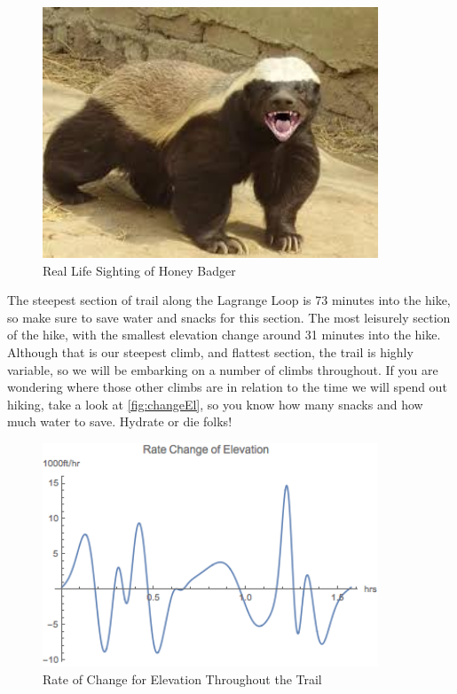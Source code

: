 \documentclass[12pt]{article}   %
\theoremstyle{definition}
\numberwithin{equation}{section}
\begin{document}
\begin{figure} [h]
  \centering
  \includegraphics[width=10cm]{../images/honey_badger.jpeg}
  \caption{Real Life Sighting of Honey Badger}
  \label{fig:honeyB}
\end{figure}

\quad The steepest section of trail along the Lagrange Loop is 73 minutes into the hike, so make sure to save water and snacks for this section. The most leisurely section of the hike, with the smallest elevation change around 31 minutes into the hike.
\quad Although that is our steepest climb, and flattest section, the trail is highly variable, so we will be embarking on a number of climbs throughout. If you are wondering where those other climbs are in relation to the time we will spend out hiking, take a look at \autoref{fig:changeEl}, so you know how many snacks and how much water to save. Hydrate or die folks!

\begin{figure} [h]
  \centering
  \includegraphics[width=10cm]{../images/changeEl.png}
  \caption{Rate of Change for Elevation Throughout the Trail}
  \label{fig:changeEl}
\end{figure}
\end{document}
